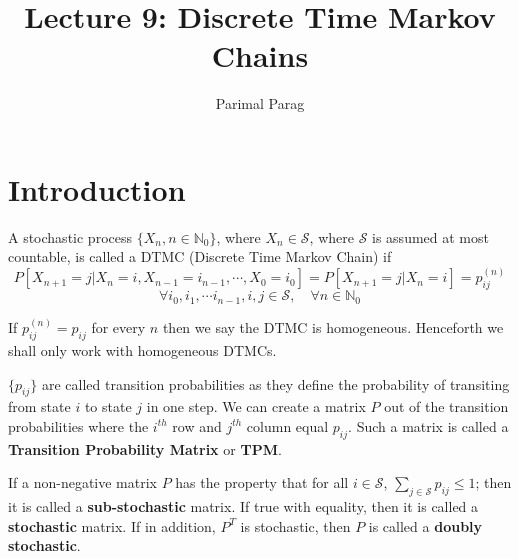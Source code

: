 \documentclass[a4paper,10pt]{article}
\title{ Lecture 9: Discrete Time Markov Chains}
\author{Parimal Parag}
\begin{document}
\maketitle
\section{Introduction}
\begin{defn}[DTMC]
A stochastic process $\{X_n, n \in \mathbb{N}_0\}$, where $X_n \in \mathcal{S}$, where $\mathcal{S}$ is assumed at most countable, is called a DTMC (Discrete Time Markov Chain) if
\[P[X_{n+1} = j| X_n = i, X_{n-1} =i_{n-1}, \cdots, X_0 = i_0] = P[X_{n+1} = j|X_n = i] = p_{ij}^{(n)}\] 
\[\forall i_0, i_1,\cdots i_{n-1}, i,j \in \mathcal{S}, \quad \forall n \in \mathbb{N}_0\]
\end{defn}

If $p_{ij}^{(n)} = p_{ij}$ for every $n$ then we say the DTMC is homogeneous. Henceforth we shall only work with homogeneous DTMCs. 

\begin{defn}
  $\{p_{ij}\}$ are called transition probabilities as they define the
  probability of transiting from state $i$ to state $j$ in one step.
  We can create a matrix $P$ out of the transition probabilities where
  the $i^{th}$ row and $j^{th}$ column equal $p_{ij}$. Such a matrix
  is called a \textbf{Transition Probability Matrix} or \textbf{TPM}.
\end{defn}
If a non-negative matrix $P$ has the property that for all $i \in \mathcal{S}$, $\sum_{j \in \mathcal{S}} p_{ij} \leq 1$; then it is called a \textbf{sub-stochastic} matrix. If true with equality, then it is called a \textbf{stochastic} matrix. If in addition, $P^T$ is stochastic, then $P$ is called a \textbf{doubly stochastic}.


\end{document}
